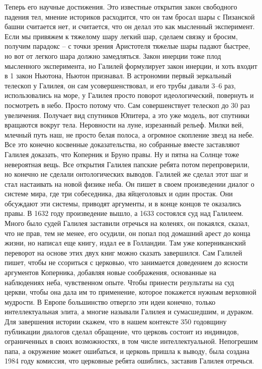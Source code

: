 \documentclass[a4paper, 12pt]{article}
\begin{document}
Теперь его научные достижения. Это известные открытия закон свободного 
падения тел, мнение историков расходится, что он там бросал шары 
с Пизанской башни считается нет, и считается, что он делал это как 
мысленный эксперимент. Если мы привяжем к тяжелому шару легкий шар, 
сделаем связку и бросим, получим парадокс -- с точки зрения Аристотеля 
тяжелые шары падают быстрее, но вот от легкого шара должно замедляться. 
Закон инерции тоже плод мысленного эксперимента, но Галилей формулирует 
закон инерции, и хоть входит в 1 закон Ньютона, Ньютон признавал. 
В астрономии первый зеркальный телескоп у Галилея, он сам 
усовершенствовал, и его трубы давали 3--6 раз, использовались на море, 
у Галилея просто поворот идеологический, повернуть и посмотреть в небо. 
Просто потому что. Сам совершенствует телескоп до 30 раз увеличения. 
Получает вид спутников Юпитера, а это уже модель, вот спутники вращаются 
вокруг тела. Неровности на луне, изрезанный рельеф. Милки вей, млечный 
путь наш, не просто белая полоса, а огромное скопление звезд на небе. 
Все это конечно косвенные доказательства, но собранные вместе заставляют 
Галилея доказать, что Коперник и Бруно правы. Ну и пятна на Солнце тоже 
невероятная вещь. Все открытия Галилея папские ребята потом 
перепроверили, но конечно не сделали онтологических выводов. Галилей же 
сделал этот шаг и стал настаивать на новой физике неба. Он пишет в своем 
произведении диалог о системе мира, где три собеседника, два яйцеголовых 
и один простак. Они обсуждают эти системы, приводят аргументы, и в конце 
концов те оказались правы. В 1632 году произведение вышло, а 1633 
состоялся суд над Галилеем. Много было судей Галилея заставили отречься 
на коленях, он покаялся, сказал, что не прав, тем не менее, его осудили, 
он попал под домашний арест до конца жизни, но написал еще книгу, издал 
ее в Голландии. Там уже коперниканский переворот на основе этих двух 
книг можно сказать завершился. Сам Галилей пишет, чтобы не ссориться 
с церковью, что занимается доведением до ясности аргументов Коперника, 
добавляя новые соображения, основанные на наблюдениях неба, чувственном 
опыте. Чтобы принести результаты на суд церкви, чтобы она дала им то 
применение, которое покажется нужным верховной мудрости. В Европе 
большинство отвергло эти идеи конечно, только интеллектуальная элита, 
а многие называли Галилея и сумасшедшим, и дураком. Для завершения 
истории скажем, что в нашем контексте 350 годовщину публикации диалогов 
сделал обращение, что церковь состоит из индивидов, ограниченных в своих 
возможностях, в том числе интеллектуальной. Непогрешим папа, а окружение 
может ошибаться, и церковь пришла к выводу, была создана 1984 году 
комиссия, что церковные ребята ошиблись, заставив Галилея отречься.
\end{document}

